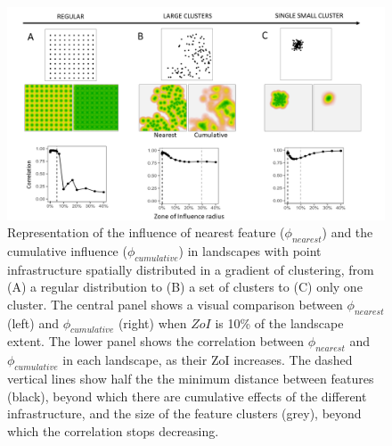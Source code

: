 \documentclass[titlepage]{article}
\begin{document}
{\begin{figure}[h]
\centering
\includegraphics[width=1.3\textwidth,center]{figures/simulated_landscapes.png}
\caption{\label{fig:simulated_landscapes} Representation of the influence of nearest feature ($\phi_{nearest}$) and the cumulative influence ($\phi_{cumulative}$) in landscapes with point infrastructure spatially distributed in a gradient of clustering, from (A) a regular distribution 
to (B) a set of clusters 
to (C) only one cluster. 
The central panel shows a visual comparison between $\phi_{nearest}$ (left) and $\phi_{cumulative}$ (right) when $ZoI$ is 10\% of the landscape extent. The lower panel shows the correlation between $\phi_{nearest}$ and $\phi_{cumulative}$ in each landscape, as their ZoI increases. The dashed vertical lines show half the the minimum distance between features (black), beyond which there are cumulative effects of the different infrastructure, and the size of the feature clusters (grey), beyond which the correlation stops decreasing.}
\end{figure}

}
\end{document}
